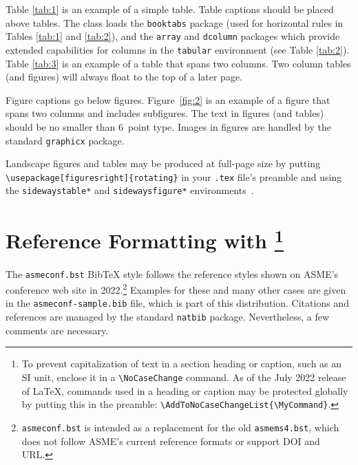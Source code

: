 \documentclass[captionpatch,colorlinks,upint,subscriptcorrection,varvw,german]{asmeconf}
\begin{document}
Table \ref{tab:1} is an example of a simple table. Table captions should be placed above tables.
The class loads the \texttt{booktabs} package (used for horizontal rules in Tables \ref{tab:1} and \ref{tab:2}), and the \texttt{array} and \texttt{dcolumn} packages which provide extended capabilities for columns in the \texttt{tabular} environment (see Table \ref{tab:2}).  Table \ref{tab:3} is an example of a table that spans two columns. Two column tables (and figures) will always float to the top of a later page.

Figure captions go below figures. Figure~\ref{fig:2} is an example of a figure that spans two columns and includes subfigures. The text in figures (and tables) should be no smaller than 6~point type. Images in figures are handled by the standard \texttt{graphicx} package.

Landscape figures and tables may be produced at full-page size by putting \verb|\usepackage[figuresright]{rotating}| in your \texttt{.tex} file's preamble and using the \texttt{sidewaystable*} and \texttt{sidewaysfigure*} environments~\cite{fairbairns}.



\section{Reference Formatting with \footnote{To prevent capitalization of text in a section heading or caption, such as an SI unit, enclose it in a \texttt{\textbackslash NoCaseChange} command. As of the July 2022 release of \LaTeX, commands used in a heading or caption may be protected globally by putting this in the preamble: \texttt{\textbackslash AddToNoCaseChangeList\{\textbackslash MyCommand\}}.}}\label{sec:references}

The {\upshape\texttt{asmeconf.bst}} Bib\TeX{}  style follows the reference styles shown on ASME's conference web site in  2022.\footnote{\texttt{asmeconf.bst} is intended as a replacement for the old \texttt{asmems4.bst}, which does not follow ASME's current reference formats or support DOI and URL.}
Examples for these and many other cases are given in the \texttt{asmeconf-sample.bib} file, which is part of this distribution. Citations and references are managed by the standard \texttt{natbib} package.  Nevertheless, a few comments are necessary. 

\end{document}
